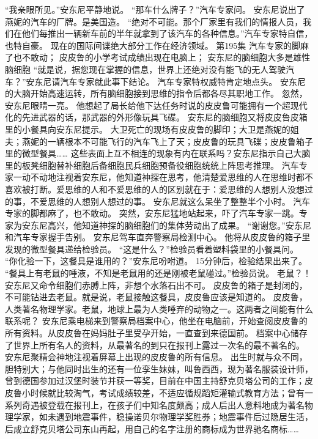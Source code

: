 \documentclass[a4paper,12pt,UTF8,twoside]{ctexbook}
\begin{document}
        “我亲眼所见。”安东尼平静地说。 
        “那车什么牌子？”汽车专家问。 
        安东尼说出了燕妮的汽车的厂牌。是美国造。 
        “绝对不可能。那个厂家里有我们的情报人员，我们在他们每推出一辆新车前的半年就拿到了该汽车的各种信息。”汽车专家特自信，也特自豪。 
        现在的国际间谍绝大部分工作在经济领域。   第195集 
        汽车专家的脚麻了也不敢动； 
        皮皮鲁的小学考试成绩出现在电脑上； 
        安东尼的脑细胞大多是雄性脑细胞   
        “就是说，据您现在掌握的信息，世界上还绝对没有能飞的无人驾驶汽车？”安东尼请汽车专家就此事下结论。 
        汽车专家特权威特肯定地点头。 
        安东尼的大脑开始高速运转，所有脑细胞接到思维的指令后都各尽其职地工作。 
      忽然，安东尼眼睛一亮。 
      他想起了局长给他下达任务时说的皮皮鲁可能拥有一个超现代化的先进武器的话，那武器的外形像玩具飞碟。 
        安东尼的脑细胞又将皮皮鲁皮箱里的小餐具向安东尼提示。 
        大卫死亡的现场有皮皮鲁的脚印；大卫是燕妮的姐夫；燕妮的一辆根本不可能飞行的汽车飞上了天；皮皮鲁的玩具飞碟；皮皮鲁箱子里的微型餐具…… 
        这些表面上互不相连的现象有内在联系吗？安东尼指示自己大脑里的板凳细胞替补细胞后备细胞民兵细胞预备役细胞统统上阵思考推理。 
        汽车专家一动不动地注视着安东尼，他知道神探在思考，他清楚爱思维的人在思维时都不喜欢被打断。爱思维的人和不爱思维的人的区别就在于：爱思维的人想别人没想过的事，不爱思维的人想别人想过的事。 
        安东尼就这么呆坐了整整半个小时。 
        汽车专家的脚都麻了，也不敢动。 
        突然，安东尼猛地站起来，吓了汽车专家一跳。专家为安东尼高兴，他知道神探的脑细胞们的集体劳动出了成果。 
        “谢谢您。”安东尼和汽车专家握手告别。 
        安东尼驾车直奔警察局检测中心。 
        他将从皮皮鲁的箱子里发现的微型餐具递给检验员。 
        “这是什么？”检验员看着塑料袋里的小餐具问。 
        “你化验一下，这餐具是谁用的？”安东尼吩咐道。 
        15分钟后，检验结果出来了。 
        “餐具上有老鼠的唾液，不知是老鼠用的还是刚被老鼠碰过。”检验员说。 
        老鼠？！安东尼又命令细胞们赤膊上阵，非想个水落石出不可。 
        皮皮鲁的箱子是封闭的，不可能钻进去老鼠。就是说，老鼠接触这餐具，皮皮鲁应该是知道的。 
        皮皮鲁，人类著名物理学家。老鼠，地球上最为人类唾弃的动物之一。这两者之间能有什么联系呢？ 
        安东尼乘电梯来到警察局档案中心，他坐在电脑前，开始查阅皮皮鲁的所有资料。从皮皮鲁在妈妈肚子里受孕开始，一直查到来德国前。 
        档案中心储存了世界上所有名人的资料，从最著名的到只在报刊上露过一次名的最不著名的。 
        安东尼聚精会神地注视着屏幕上出现的皮皮鲁的所有信息。 
        出生时就与众不同，胆特别大；与他同时出生的还有一位孪生妹妹，叫鲁西西，现为著名服装设计师，曾到德国参加过汉堡时装节并获一等奖，目前在中国主持舒克贝塔公司的工作；皮皮鲁小时候就比较淘气，考试成绩较差，不适应循规蹈矩灌输式教育方法；曾有一系列奇遇被登载在报刊上，在孩子们中知名度颇高；成人后出人意料地成为著名物理学家，如未遇到地震事件，稳操诺贝尔物理学奖胜券；地震事件后过隐居生活，后成立舒克贝塔公司东山再起，用自己的名字注册的商标成为世界驰名商标…… 
\end{document}
